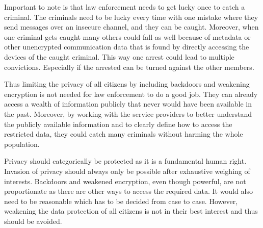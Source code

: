 \documentclass[12pt]{article}
\begin{document}
Important to note is that law enforcement needs to get lucky once to catch a criminal. The criminals need to be lucky every time with one mistake where they send messages over an insecure channel, and they can be caught. Moreover, when one criminal gets caught many others could fall as well because of metadata or other unencrypted communication data that is found by directly accessing the devices of the caught criminal. This way one arrest could lead to multiple convictions. Especially if the arrested can be turned against the other members. 

Thus limiting the privacy of all citizens by including backdoors and weakening encryption is not needed for law enforcement to do a good job. They can already access a wealth of information publicly that never would have been available in the past. Moreover, by working with the service providers to better understand the publicly available information and to clearly define how to access the restricted data, they could catch many criminals without harming the whole population.

Privacy should categorically be protected as it is a fundamental human right. Invasion of privacy should always only be possible after exhaustive weighing of interests. Backdoors and weakened encryption, even though powerful, are not proportionate as there are other ways to access the required data. It would also need to be reasonable which has to be decided from case to case. However, weakening the data protection of all citizens is not in their best interest and thus should be avoided.


\clearpage




\end{document}
